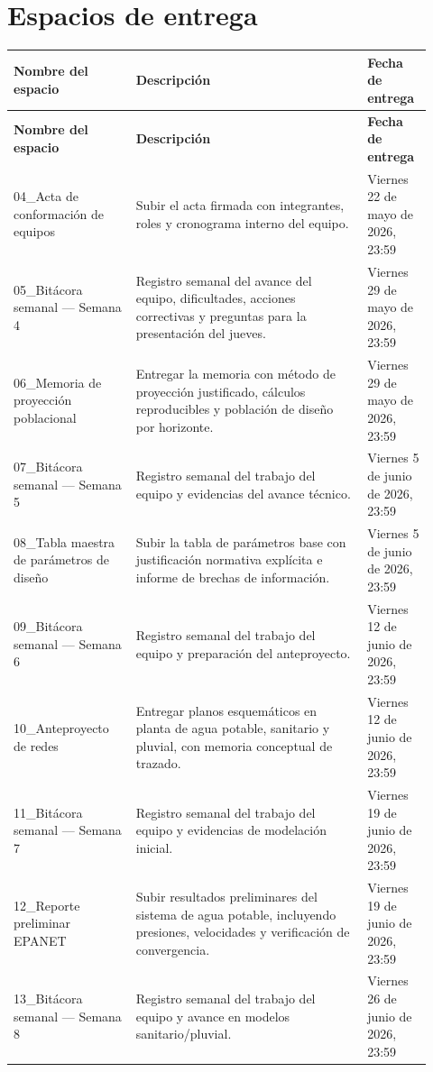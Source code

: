 \documentclass[11pt]{article}
\begin{document}
\section{Espacios de entrega}
\begin{longtable}{p{0.27\linewidth} p{0.51\linewidth} p{0.14\linewidth}}
\toprule
\textbf{Nombre del espacio} & \textbf{Descripci\'on} & \textbf{Fecha de entrega} \\
\midrule
\endfirsthead
\toprule
\textbf{Nombre del espacio} & \textbf{Descripci\'on} & \textbf{Fecha de entrega} \\
\midrule
\endhead
04\_Acta de conformaci\'on de equipos & Subir el acta firmada con integrantes, roles y cronograma interno del equipo. & Viernes 22 de mayo de 2026, 23:59 \\
05\_Bit\'acora semanal --- Semana 4 & Registro semanal del avance del equipo, dificultades, acciones correctivas y preguntas para la presentaci\'on del jueves. & Viernes 29 de mayo de 2026, 23:59 \\
06\_Memoria de proyecci\'on poblacional & Entregar la memoria con m\'etodo de proyecci\'on justificado, c\'alculos reproducibles y poblaci\'on de dise\~no por horizonte. & Viernes 29 de mayo de 2026, 23:59 \\
07\_Bit\'acora semanal --- Semana 5 & Registro semanal del trabajo del equipo y evidencias del avance t\'ecnico. & Viernes 5 de junio de 2026, 23:59 \\
08\_Tabla maestra de par\'ametros de dise\~no & Subir la tabla de par\'ametros base con justificaci\'on normativa expl\'icita e informe de brechas de informaci\'on. & Viernes 5 de junio de 2026, 23:59 \\
09\_Bit\'acora semanal --- Semana 6 & Registro semanal del trabajo del equipo y preparaci\'on del anteproyecto. & Viernes 12 de junio de 2026, 23:59 \\
10\_Anteproyecto de redes & Entregar planos esquem\'aticos en planta de agua potable, sanitario y pluvial, con memoria conceptual de trazado. & Viernes 12 de junio de 2026, 23:59 \\
11\_Bit\'acora semanal --- Semana 7 & Registro semanal del trabajo del equipo y evidencias de modelaci\'on inicial. & Viernes 19 de junio de 2026, 23:59 \\
12\_Reporte preliminar EPANET & Subir resultados preliminares del sistema de agua potable, incluyendo presiones, velocidades y verificaci\'on de convergencia. & Viernes 19 de junio de 2026, 23:59 \\
13\_Bit\'acora semanal --- Semana 8 & Registro semanal del trabajo del equipo y avance en modelos sanitario/pluvial. & Viernes 26 de junio de 2026, 23:59 \\

\end{longtable}
\end{document}
